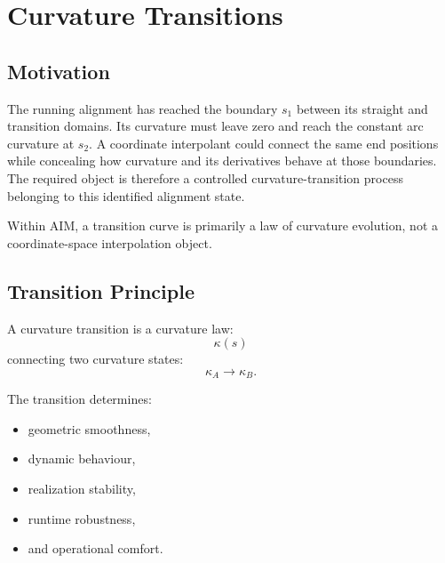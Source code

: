 
\chapter{Curvature Transitions}

\label{chap:curvature-transitions}

\section*{Motivation}

The running alignment has reached the boundary $s_1$ between its straight
and transition domains. Its curvature must leave zero and reach the constant
arc curvature at $s_2$. A coordinate interpolant could connect the same end
positions while concealing how curvature and its derivatives behave at those
boundaries. The required object is therefore a controlled curvature-transition
process belonging to this identified alignment state.

\begin{principle}
\label{princ:curvature-transition}
Within AIM, a transition curve is primarily a law of curvature evolution,
not a coordinate-space interpolation object.
\end{principle}

\section{Transition Principle}

\begin{definition}
\label{def:curvature-transition}
A curvature transition is a curvature law:
\[
\kappa(s)
\]
connecting two curvature states:
\[
\kappa_A
\rightarrow
\kappa_B.
\]
\end{definition}

The transition determines:
\begin{itemize}
\item geometric smoothness,
\item dynamic behaviour,
\item realization stability,
\item runtime robustness,
\item and operational comfort.
\end{itemize}

